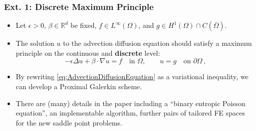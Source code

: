 \documentclass[aspectratio=169,xcolor=dvipsnames,11pt]{beamer}
\begin{document}
\begin{frame}\frametitle{Ext. 1: Discrete Maximum Principle}
\begin{itemize}
\item
Let $\epsilon > 0$, $\beta \in \mathbb{R}^d$ be fixed, $f \in L^\infty(\Omega)$, and $g \in H^1(\Omega) \cap C(\overline{\Omega})$. 
\item The solution $u$ to the advection diffusion equation should satisfy a maximum principle on the continuous and \textbf{discrete} level:
\begin{equation}
\label{eq:AdvectionDiffusionEquation}
	-\epsilon\Delta u + \beta\cdot\nabla u = f
	\quad \text{in~} \Omega,
	\qquad
	u = g \quad \text{on~} \partial\Omega
	\,,
\end{equation}
\item By rewriting \eqref{eq:AdvectionDiffusionEquation} as a variational inequality, we can develop a Proximal Galerkin scheme.
\item There are (many) details in the paper including a ``binary entropic Poisson equation'', an implementable algorithm, further pairs of tailored FE spaces for the new saddle point problems.
\end{itemize}
\end{frame}
\end{document}
